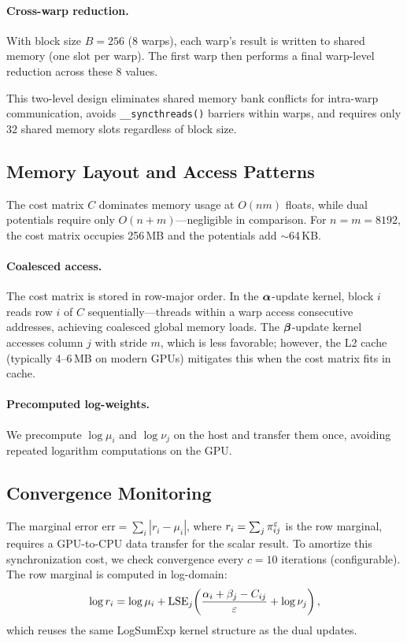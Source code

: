 \paragraph{Cross-warp reduction.} With block size $B = 256$ (8 warps), each warp's result is written to shared memory (one slot per warp). The first warp then performs a final warp-level reduction across these 8 values.

This two-level design eliminates shared memory bank conflicts for intra-warp communication, avoids \texttt{\_\_syncthreads()} barriers within warps, and requires only $32$ shared memory slots regardless of block size.

\subsection{Memory Layout and Access Patterns}
\label{sec:memory}

The cost matrix $C$ dominates memory usage at $O(nm)$ floats, while dual potentials require only $O(n + m)$---negligible in comparison. For $n = m = 8192$, the cost matrix occupies 256\,MB and the potentials add $\sim$64\,KB.

\paragraph{Coalesced access.} The cost matrix is stored in row-major order. In the $\bm{\alpha}$-update kernel, block $i$ reads row $i$ of $C$ sequentially---threads within a warp access consecutive addresses, achieving coalesced global memory loads. The $\bm{\beta}$-update kernel accesses column $j$ with stride $m$, which is less favorable; however, the L2 cache (typically 4--6\,MB on modern GPUs) mitigates this when the cost matrix fits in cache.

\paragraph{Precomputed log-weights.} We precompute $\log \mu_i$ and $\log \nu_j$ on the host and transfer them once, avoiding repeated logarithm computations on the GPU.

\subsection{Convergence Monitoring}
\label{sec:convergence}

The marginal error $\mathrm{err} = \sum_i |r_i - \mu_i|$, where $r_i = \sum_j \pi^\varepsilon_{ij}$ is the row marginal, requires a GPU-to-CPU data transfer for the scalar result. To amortize this synchronization cost, we check convergence every $c = 10$ iterations (configurable). The row marginal is computed in log-domain:
\begin{equation}
    \log r_i = \log \mu_i + \mathrm{LSE}_j\!\left(\frac{\alpha_i + \beta_j - C_{ij}}{\varepsilon} + \log \nu_j\right),
\end{equation}
which reuses the same LogSumExp kernel structure as the dual updates.

